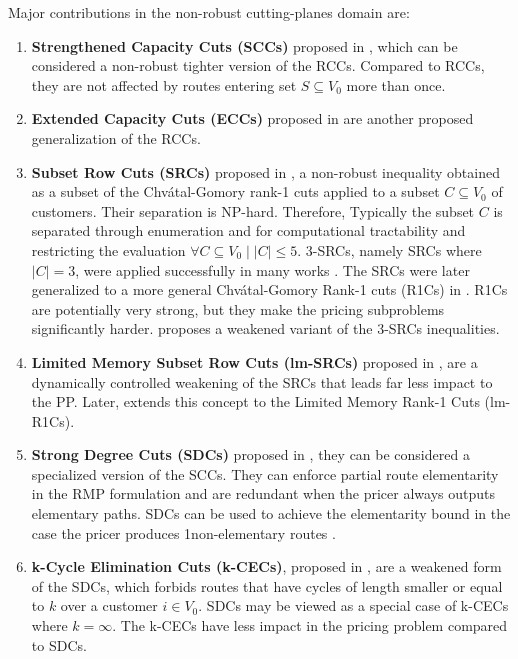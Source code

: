 \medskip

Major contributions in the non-robust cutting-planes domain are:

\begin{enumerate}
	\setlength{\itemsep}{0pt}
	\setlength{\parskip}{0pt}

	\item \textbf{Strengthened Capacity Cuts (SCCs)} proposed in \textcite{baldacci2008},
	      which can be considered a non-robust tighter version of the RCCs.
	      Compared to RCCs, they are not affected by routes entering set $S \subseteq V_0$ more than once.
	\item \textbf{Extended Capacity Cuts (ECCs)} proposed in \textcite{pessoa2008, pessoa2009}
	      are another proposed generalization of the RCCs.
	\item \textbf{Subset Row Cuts (SRCs)} proposed in \textcite{jepsen2008a}, a non-robust
	      inequality obtained as a subset of the  Chv\'atal-Gomory rank-1 cuts \parencite{chvatal1973}
	      applied to a subset $C \subseteq V_0$ of customers.
	      Their separation is NP-hard.
	      Therefore, Typically the subset $C$ is separated through enumeration
	      and for computational tractability and restricting the evaluation $\forall C \subseteq V_0 \mid |C| \le 5$.
	      3-SRCs, namely SRCs where $|C| = 3$, were applied successfully in many works \parencite{desaulniers2008, jepsen2008, baldacci2011, contardo2014, pecin2017}.
	      The SRCs were later generalized to a more general Chv\'atal-Gomory Rank-1 cuts (R1Cs) in \textcite{petersen2008}.
          R1Cs are potentially very strong, but they make the pricing subproblems significantly harder.
	      \textcite{baldacci2011} proposes a weakened variant of the 3-SRCs inequalities.
	\item \textbf{Limited Memory Subset Row Cuts (lm-SRCs)} proposed in \textcite{pecin2017},
	      are a dynamically controlled weakening of the SRCs that leads far less impact to
	      the PP.
	      Later, \textcite{pecin2017a} extends this concept to the Limited Memory Rank-1 Cuts (lm-R1Cs).
	\item \textbf{Strong Degree Cuts (SDCs)} proposed in \textcite{contardo2011, contardo2014}, they can be considered
	      a specialized version of the SCCs.
	      They can enforce partial route elementarity in the RMP formulation
	      and are redundant when the pricer always outputs elementary paths.
	      SDCs can be used to achieve the elementarity bound in the case
	      the pricer produces 1non-elementary routes \parencite{contardo2014}.
	\item \textbf{k-Cycle Elimination Cuts (k-CECs)}, proposed in \textcite{contardo2014},
	      are a weakened form of the SDCs, which forbids
	      routes that have cycles of length smaller or equal to $k$ over a customer $i \in V_0$.
	      SDCs may be viewed as a special case of k-CECs where $k = \infty$.
	      The k-CECs have less impact in the pricing problem compared to SDCs.
\end{enumerate}


